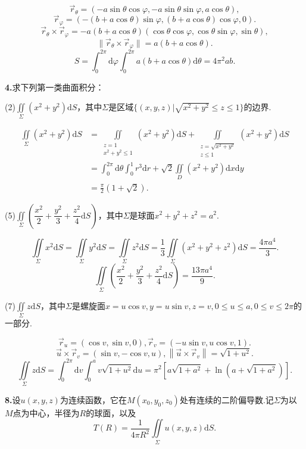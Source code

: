 \documentclass[12pt, a4paper]{article}
\newcommand{\dif}{\mathrm{d}}
\begin{document}
\[\vec{r}_\theta = (-a\sin\theta\cos\varphi, -a\sin\theta\sin\varphi, a\cos\theta),\]
\[\vec{r}_\varphi = (-(b + a\cos\theta)\sin\varphi, (b + a\cos\theta)\cos\varphi, 0).\]
\[\vec{r}_\theta \times \vec{r}_\varphi = -a(b + a\cos\theta)(\cos\theta\cos\varphi, \cos\theta\sin\varphi, \sin\theta),\]
\[\|\vec{r}_\theta \times \vec{r}_\varphi\| = a(b + a\cos\theta).\]
\[S = \int_{0}^{2\pi} \dif \varphi \int_{0}^{2\pi} a(b + a\cos\theta) \dif \theta = 4\pi^2ab.\]

\textbf{4.}求下列第一类曲面积分：

(2)\(\iint\limits_\Sigma (x^2 + y^2) \dif S\)，其中\(\Sigma\)是区域\(\{(x, y, z)|\sqrt{x^2 + y^2} \leq z \leq 1\}\)的边界.

\begin{align*}
\iint\limits_\Sigma (x^2 + y^2) \dif S &= \iint\limits_{\substack{z = 1 \\ x^2 + y^2 \leq 1}} (x^2 + y^2) \dif S + \iint\limits_{\substack{z = \sqrt{x^2 + y^2} \\ z \leq 1}} (x^2 + y^2) \dif S \\
&= \int_{0}^{2\pi} \dif \theta \int_0^1 r^3 \dif r + \sqrt{2}\iint\limits_D (x^2 + y^2) \dif x \dif y \\
&= \frac{\pi}{2}(1 + \sqrt{2}).
\end{align*}

(5)\(\iint\limits_\Sigma \left(\dfrac{x^2}{2} + \dfrac{y^2}{3} + \dfrac{z^2}{4} \dif S\right)\)，其中\(\Sigma\)是球面\(x^2 + y^2 + z^2 = a^2\).

\[\iint\limits_\Sigma x^2 \dif S = \iint\limits_\Sigma y^2 \dif S = \iint\limits_\Sigma z^2 \dif S = \frac{1}{3} \iint\limits_\Sigma (x^2 + y^2 + z^2) \dif S = \frac{4\pi a^4}{3}.\]
\[\iint\limits_\Sigma \left(\dfrac{x^2}{2} + \dfrac{y^2}{3} + \dfrac{z^2}{4} \dif S\right) = \frac{13\pi a^4}{9}.\]

(7)\(\iint\limits_\Sigma z \dif S\)，其中\(\Sigma\)是螺旋面\(x = u\cos v, y = u\sin v, z = v, 0 \leq u \leq a, 0 \leq v \leq 2\pi\)的一部分.

\[\vec{r}_u = (\cos v, \sin v, 0), \vec{r}_v = (- u\sin v, u\cos v, 1).\]
\[\vec{u} \times \vec{r}_v = (\sin v, -\cos v, u), \left\|\vec{u} \times \vec{r}_v\right\| = \sqrt{1 + u^2}.\]
\[\iint\limits_\Sigma z \dif S = \int_{0}^{2\pi} \dif v \int_0^a v\sqrt{1 + u^2} \dif u = \pi^2\left[a\sqrt{1 + a^2} + \ln\left(a + \sqrt{1 + a^2}\right)\right].\]

\textbf{8.}设\(u(x, y ,z)\)为连续函数，它在\(M(x_0, y_0, z_0)\)处有连续的二阶偏导数.记\(\Sigma\)为以\(M\)点为中心，半径为\(R\)的球面，以及
\[T(R) = \frac{1}{4\pi R^2}\iint\limits_\Sigma u(x, y, z) \dif S.\]
\end{document}
